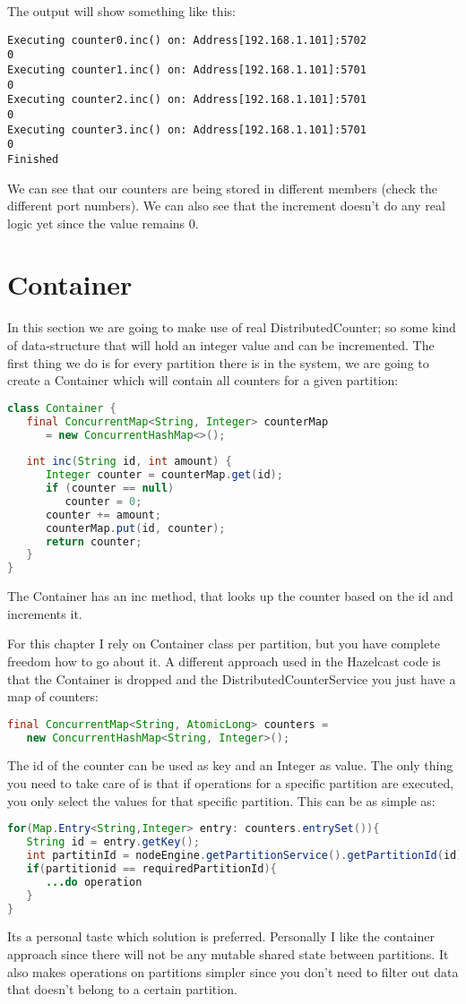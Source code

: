 The output will show something like this:
\begin{lstlisting}
Executing counter0.inc() on: Address[192.168.1.101]:5702
0
Executing counter1.inc() on: Address[192.168.1.101]:5701
0
Executing counter2.inc() on: Address[192.168.1.101]:5701
0
Executing counter3.inc() on: Address[192.168.1.101]:5701
0
Finished
\end{lstlisting}
We can see that our counters are being stored in different members (check the different port numbers). We can also see that the increment doesn't do any real logic yet since the value remains 0.

\section{Container}
In this section we are going to make use of real DistributedCounter; so some kind of data-structure that will hold an integer value and can be incremented. The first thing we do is for every partition there is in the system, we are going to create a Container which will contain all counters for a given partition:
\begin{lstlisting}[language=java]
class Container {
   final ConcurrentMap<String, Integer> counterMap 
      = new ConcurrentHashMap<>();
   
   int inc(String id, int amount) {
      Integer counter = counterMap.get(id);
      if (counter == null) 
         counter = 0;
      counter += amount;
      counterMap.put(id, counter);
      return counter;
   }
}
\end{lstlisting}
The Container has an inc method, that looks up the counter based on the id and increments it. 

For this chapter I rely on Container class per partition, but you have complete freedom how to go about it. A different approach used in the Hazelcast code is that the Container is dropped and the DistributedCounterService you just have a map of counters:
\begin{lstlisting}[language=java]
final ConcurrentMap<String, AtomicLong> counters = 
   new ConcurrentHashMap<String, Integer>();
\end{lstlisting}
The id of the counter can be used as key and an Integer as value. The only thing you need to take care of is that if operations for a specific partition are executed, you only select the values for that specific partition. This can be as simple as: 
\begin{lstlisting}[language=java]
for(Map.Entry<String,Integer> entry: counters.entrySet()){
   String id = entry.getKey();
   int partitinId = nodeEngine.getPartitionService().getPartitionId(id); 
   if(partitionid == requiredPartitionId){
      ...do operation	
   }
}
\end{lstlisting}
Its a personal taste which solution is preferred. Personally I like the container approach since there will not be any mutable shared state between partitions. It also makes operations on partitions simpler since you don't need to filter out data that doesn't belong to a certain partition.

